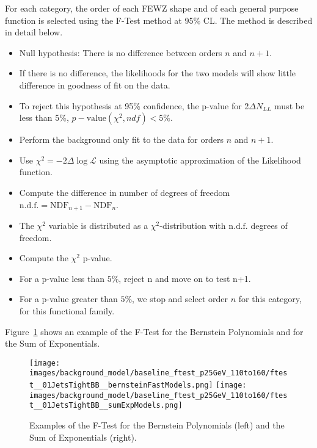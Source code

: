 For each category, the order of each FEWZ shape and of each general purpose function is selected using the F-Test method at 95\% CL. The method is described in detail below.
\begin{itemize}
    \item Null hypothesis: There is no difference between orders $n$ and $n+1$.
    \item If there is no difference, the likelihoods for the two models will show little difference in goodness of fit on the data.
    \item To reject this hypothesis at 95\% confidence, the p-value for 2$\Delta N_{LL}$ must be less than 5\%, $p-\text{value}(\chi^2, ndf) < 5\%$.
    \item Perform the background only fit to the data for orders $n$ and $n+1$.
    \item Use $\chi^2 = -2\Delta\log\mathcal{L}$ using the asymptotic approximation of the Likelihood function.
    \item Compute the difference in number of degrees of freedom $\text{n.d.f.} = \text{NDF}_{n+1} - \text{NDF}_{n}$.
    \item The $\chi^2$ variable is distributed as a $\chi^2$-distribution with $\text{n.d.f.}$ degrees of freedom.
    \item Compute the $\chi^2$ p-value.
    \item For a p-value less than $5\%$, reject n and move on to test n+1.
    \item For a p-value greater than $5\%$, we stop and select order $n$ for this category, for this functional family.
\end{itemize}
Figure~\ref{bkgmodel:exampleFTest} shows an example of the F-Test for the Bernstein Polynomials and for the Sum of Exponentials.
\begin{figure}[hbp]
     \centering
     \texttt{[image: images/background\_model/baseline\_ftest\_p25GeV\_110to160/ftest\_\_01JetsTightBB\_\_bernsteinFastModels.png]}
     \texttt{[image: images/background\_model/baseline\_ftest\_p25GeV\_110to160/ftest\_\_01JetsTightBB\_\_sumExpModels.png]}
     \caption[An example of the F-Test for the ordered background fits.]
     {Examples of the F-Test for the Bernstein Polynomials (left) and the Sum of Exponentials (right).}
     \label{bkgmodel:exampleFTest}
\end{figure}

